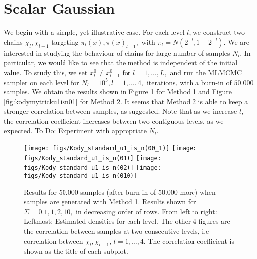 \documentclass[a4paper]{article}
\begin{document}
\section{Scalar Gaussian}
We begin with a simple, yet illustrative case. For each level $l$, we construct two chains $\chi_l,\chi_{l-1}$ targeting $\pi_l(x), \pi(x)_{l-1},$ with $\pi_l= N(2^{-l},1+2^{-l})$. 
We are interested in studying the behaviour of  chains for large number of samples $N_l$. In particular, we would like to see that the method is independent of the initial value. To study this, we set $x^0_l\neq x^0_{l-1}$ for $l=1,\dots,L,$  and run the MLMCMC sampler on each level for $N_l=10^5, l=1,\dots,4,$ iterations, with a burn-in of $50.000$ samples.  We obtain the results shown in Figure \ref{fig:kodystandardu1isn001} for Method 1 and Figure \ref{fig:kodymytricku1isn01} for Method  2. It seems that Method 2 is able to keep a stronger correlation between samples, as suggested. Note that as we increase $l$, the correlation coefficient increases between two contiguous levels, as we expected. 	\color{red} To Do: Experiment with appropriate $N_l$.
\color{black}
\begin{figure}[H]
	\centering
	\texttt{[image: figs/Kody\_standard\_u1\_is\_n(00\_1)]}
		\texttt{[image: figs/Kody\_standard\_u1\_is\_n(01)]}
			\texttt{[image: figs/Kody\_standard\_u1\_is\_n(02)]}
				\texttt{[image: figs/Kody\_standard\_u1\_is\_n(010)]}
	\caption{Results for 50.000 samples (after burn-in of 50.000 more) when samples are generated with Method 1. Results shown for $\Sigma=0.1,1,2,10,$ in decreasing order of rows. From left to right: Leftmost: Estimated densities for each level. The other 4 figures are the correlation between samples at two consecutive levels, i.e correlation between $\chi_l,\chi_{l-1}$, $l=1,\dots,4$. The correlation coefficient is shown as the title of each subplot. }
	\label{fig:kodystandardu1isn001}
\end{figure}
\end{document}
